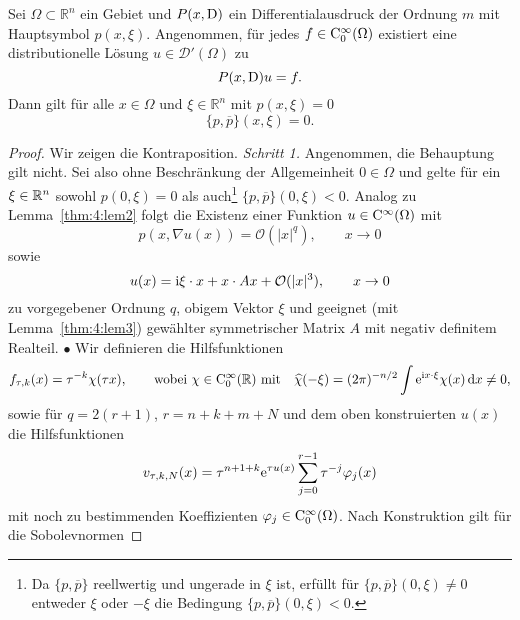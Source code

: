 \begin{thm}\label{thm:3.1_hoer}
Sei $\Omega\subset\mathbb{R}^n$ ein Gebiet und $P(x,\mathrm D)$ ein Differentialausdruck der Ordnung $m$ mit Hauptsymbol $p(x,\xi)$.
Angenommen, für jedes $f\in \mathrm C_0^\infty(\Omega)$  existiert eine distributionelle Lösung $u\in\mathscr D'(\Omega)$ zu
\begin{equation}\label{eq:3.1_hoer}
P(x,\mathrm D)u=f.
\end{equation}
Dann gilt für alle $x\in\Omega$ und $\xi\in\mathbb{R}^n$ mit $p(x,\xi)=0$
\begin{equation}\label{eq:3.1_hoer_aussage}
 \{p,\overline{p}\}(x,\xi)=0.
\end{equation}
\end{thm}
\begin{proof}
Wir zeigen die Kontraposition. {\sl Schritt 1.} Angenommen, die Behauptung gilt nicht. Sei also ohne Beschränkung der Allgemeinheit $0\in\Omega$ und gelte für ein $\xi\in\mathbb R^n$ sowohl $p(0,\xi)=0$ als auch\footnote{Da $\{p,\overline p\}$ reellwertig und ungerade in $\xi$ ist, erfüllt für $\{p,\overline p\}(0,\xi)\ne0$ entweder $\xi$ oder $-\xi$ die Bedingung $\{p,\overline p\}(0,\xi)<0$.}   $\{p,\overline p\}(0,\xi)<0$. Analog zu Lemma~\ref{thm:4:lem2} folgt die Existenz einer Funktion $u\in\mathrm C^\infty(\Omega)$ mit 
\begin{equation}
    p(x,\nabla u(x)) = \mathcal O(|x|^q),\qquad x\to0
\end{equation}
sowie
\begin{equation}
   u(x) = \mathrm i \xi\cdot x + x\cdot Ax + \mathcal O(|x|^3),\qquad x\to0 
\end{equation}
zu vorgegebener Ordnung $q$, obigem Vektor $\xi$ und geeignet (mit Lemma~\ref{thm:4:lem3}) gewählter symmetrischer Matrix $A$ mit negativ definitem Realteil. 
$\bullet$ Wir definieren die Hilfsfunktionen
\begin{equation}
   f_{\tau, k}(x) = \tau^{-k} \chi(\tau x),\qquad \text{wobei $\chi\in\mathrm C_0^\infty(\mathbb R)$ mit}\quad \widehat \chi(-\xi) = (2\pi)^{-n/2}  \int \mathrm e^{\mathrm i x\cdot\xi} \chi(x) \,\mathrm d x \ne 0,
\end{equation}
sowie für $q=2(r+1)$, $r=n+k+m+N$ und dem oben konstruierten $u(x)$ die Hilfsfunktionen
\begin{equation}
   v_{\tau,k,N} (x) = \tau^{n+1+k} \mathrm e^{\tau u(x)} \sum_{j=0}^{r-1} \tau^{-j} \varphi_j(x) 
\end{equation}
mit noch zu bestimmenden Koeffizienten $\varphi_j\in\mathrm C_0^\infty(\Omega)$. Nach Konstruktion gilt für die Sobolevnormen

\end{proof}
